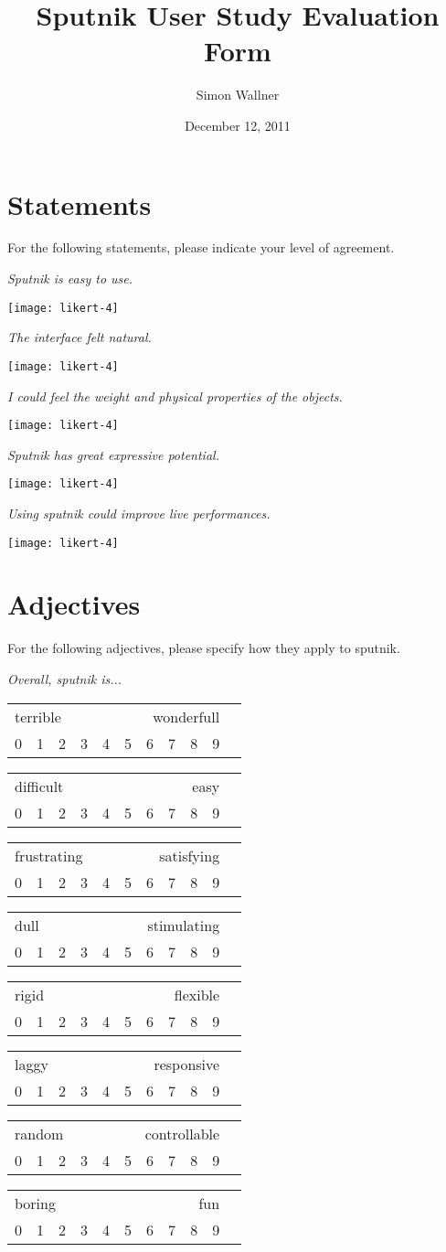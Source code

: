 \documentclass[10pt,a4paper]{scrartcl}
\title{Sputnik User Study Evaluation Form}
\author{Simon Wallner}
\date{December 12, 2011}
\newcommand{\likert}[1]{
\emph{#1}
\begin{center}
\texttt{[image: likert-4]}
\end{center}
}
\newcommand{\quis}[3]{
\emph{#1}
\quisshort{#2}{#3}
}
\newcommand{\quisshort}[2]{
\begin{center}
\begin{tabular}{c c c c c c c c c c c}
\multicolumn{5}{l}{\textsf{#1}} & \multicolumn{5}{r}{\textsf{#2}}\\
0 & 1 & 2 & 3 & 4 & 5 & 6 & 7 & 8 & 9\\
\end{tabular}
\end{center}
}
\begin{document}
\maketitle



\section{Statements}
For the following statements, please indicate your level of agreement.
\medskip

\likert{Sputnik is easy to use.}

\likert{The interface felt natural.}

\likert{I could feel the weight and physical properties of the objects.}

\likert{Sputnik has great expressive potential.}

\likert{Using sputnik could improve live performances.}


\clearpage
\section{Adjectives}
For the following adjectives, please specify how they apply to sputnik.
\medskip


\quis{Overall, sputnik is...}{terrible}{wonderfull}
\quisshort{difficult}{easy}
\quisshort{frustrating}{satisfying}
\quisshort{dull}{stimulating}
\quisshort{rigid}{flexible}
\quisshort{laggy}{responsive}
\quisshort{random}{controllable}
\quisshort{boring}{fun}
\end{document}
